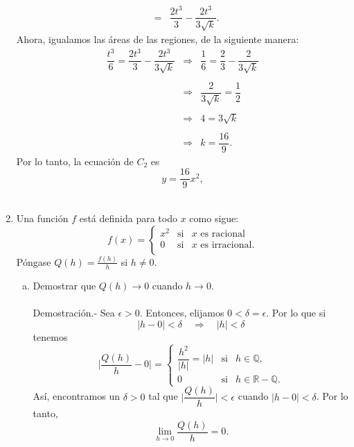 \begin{enumerate}[\bfseries 1.]
$$\begin{array}{rcl}
										    &=& \dfrac{2t^3}{3}-\dfrac{2t^3}{3\sqrt{k}}.
	\end{array}
	$$
	Ahora, igualamos las áreas de las regiones, de la siguiente manera:
	$$
	\begin{array}{rcl}
	    \dfrac{t^3}{6}=\dfrac{2t^3}{3}-\dfrac{2t^3}{3\sqrt{k}} &\Rightarrow & \dfrac{1}{6}=\dfrac{2}{3}-\dfrac{2}{3\sqrt{k}}\\\\
								   &\Rightarrow & \dfrac{2}{3\sqrt{k}}=\dfrac{1}{2}\\\\
								   &\Rightarrow & 4=3\sqrt{k}\\\\
								   &\Rightarrow & k=\dfrac{16}{9}.
	\end{array}
	$$
	Por lo tanto, la ecuación de $C_2$ es 
	$$y=\dfrac{16}{9}x^2,$$\\


    \item Una función $f$ está definida para todo $x$ como sigue:
    $$
    f(x)=
    \left\{
	\begin{array}{rcl}
	    x^2 & \mbox{si} & x \mbox{ es racional}\\
	    0 & \mbox{si} & x \mbox{ es irracional}.\\
	\end{array}
    \right.
    $$
    Póngase $Q(h)=\frac{f(h)}{h}$ si $h\neq 0.$ 

    \begin{enumerate}[a)]

	\item Demostrar que $Q(h)\to 0$ cuando $h\to 0.$\\\\
	    Demostración.-\; Sea $\epsilon>0$. Entonces, elijamos $0<\delta=\epsilon$. Por lo que si
	$$|h-0|<\delta\quad \Rightarrow \quad |h|<\delta$$
	tenemos
	$$
	\bigg|\dfrac{Q(h)}{h}-0\bigg|=
	\left\{
	    \begin{array}{rcl}
		\dfrac{h^2}{|h|}=|h| &\mbox{si}& h\in \mathbb{Q},\\
		0 &\mbox{si}& h\in \mathbb{R}-\mathbb{Q}.
	    \end{array}
	\right.
	$$
	Así, encontramos un $\delta>0$ tal que $\bigg|\dfrac{Q(h)}{h}\bigg|<\epsilon$ cuando $|h-0|<\delta$. Por lo tanto,
	$$\lim_{h\to 0}\dfrac{Q(h)}{h}=0.$$\\


\end{enumerate}
\end{enumerate}
